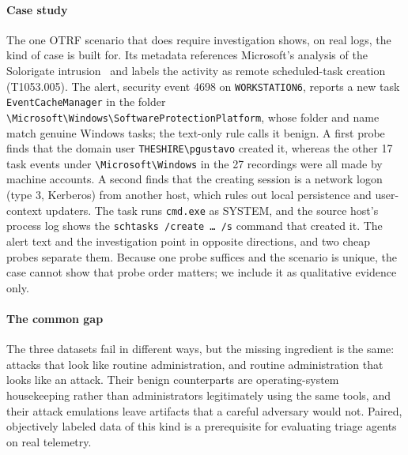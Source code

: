 \paragraph{Case study} The one OTRF scenario that does require investigation shows, on real logs, the kind of case \hesp{} is built for. Its metadata references Microsoft's analysis of the Solorigate intrusion~\citep{solorigate} and labels the activity as remote scheduled-task creation (T1053.005). The alert, security event 4698 on \texttt{WORKSTATION6}, reports a new task \texttt{EventCacheManager} in the folder \texttt{\textbackslash Microsoft\textbackslash Windows\textbackslash Software\-Protection\-Platform}, whose folder and name match genuine Windows tasks; the text-only rule calls it benign. A first probe finds that the domain user \texttt{THESHIRE\textbackslash pgustavo} created it, whereas the other 17 task events under \texttt{\textbackslash Microsoft\textbackslash Windows} in the 27 recordings were all made by machine accounts. A second finds that the creating session is a network logon (type 3, Kerberos) from another host, which rules out local persistence and user-context updaters. The task runs \texttt{cmd.exe} as SYSTEM, and the source host's process log shows the \texttt{schtasks /create \dots{} /s} command that created it. The alert text and the investigation point in opposite directions, and two cheap probes separate them. Because one probe suffices and the scenario is unique, the case cannot show that probe order matters; we include it as qualitative evidence only.

\paragraph{The common gap} The three datasets fail in different ways, but the missing ingredient is the same: attacks that look like routine administration, and routine administration that looks like an attack. Their benign counterparts are operating-system housekeeping rather than administrators legitimately using the same tools, and their attack emulations leave artifacts that a careful adversary would not. Paired, objectively labeled data of this kind is a prerequisite for evaluating triage agents on real telemetry.
